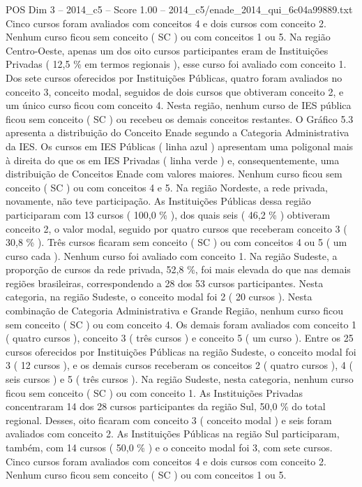 \begin{textsample}{POS Dim 3 – 2014\_c5 – Score 1.00 – 2014\_c5/enade\_2014\_qui\_6c04a99889.txt}
Cinco cursos foram avaliados com conceitos 4 e dois cursos com conceito 2.
Nenhum curso ficou sem conceito ( SC ) ou com conceitos 1 ou 5.
Na região Centro-Oeste, apenas um dos oito cursos participantes eram de Instituições Privadas ( 12,5 \% em termos regionais ), esse curso foi avaliado com conceito 1.
Dos sete cursos oferecidos por Instituições Públicas, quatro foram avaliados no conceito 3, conceito modal, seguidos de dois cursos que obtiveram conceito 2, e um único curso ficou com conceito 4.
Nesta região, nenhum curso de IES pública ficou sem conceito ( SC ) ou recebeu os demais conceitos restantes.
O Gráfico 5.3 apresenta a distribuição do Conceito Enade segundo a Categoria Administrativa da IES.
Os cursos em IES Públicas ( linha azul ) apresentam uma poligonal mais à direita do que os em IES Privadas ( linha verde ) e, consequentemente, uma distribuição de Conceitos Enade com valores maiores.
Nenhum curso ficou sem conceito ( SC ) ou com conceitos 4 e 5.
Na região Nordeste, a rede privada, novamente, não teve participação.
As Instituições Públicas dessa região participaram com 13 cursos ( 100,0 \% ), dos quais seis ( 46,2 \% ) obtiveram conceito 2, o valor modal, seguido por quatro cursos que receberam conceito 3 ( 30,8 \% ).
Três cursos ficaram sem conceito ( SC ) ou com conceitos 4 ou 5 ( um curso cada ).
Nenhum curso foi avaliado com conceito 1.
Na região Sudeste, a proporção de cursos da rede privada, 52,8 \%, foi mais elevada do que nas demais regiões brasileiras, correspondendo a 28 dos 53 cursos participantes.
Nesta categoria, na região Sudeste, o conceito modal foi 2 ( 20 cursos ).
Nesta combinação de Categoria Administrativa e Grande Região, nenhum curso ficou sem conceito ( SC ) ou com conceito 4.
Os demais foram avaliados com conceito 1 ( quatro cursos ), conceito 3 ( três cursos ) e conceito 5 ( um curso ).
Entre os 25 cursos oferecidos por Instituições Públicas na região Sudeste, o conceito modal foi 3 ( 12 cursos ), e os demais cursos receberam os conceitos 2 ( quatro cursos ), 4 ( seis cursos ) e 5 ( três cursos ).
Na região Sudeste, nesta categoria, nenhum curso ficou sem conceito ( SC ) ou com conceito 1.
As Instituições Privadas concentraram 14 dos 28 cursos participantes da região Sul, 50,0 \% do total regional.
Desses, oito ficaram com conceito 3 ( conceito modal ) e seis foram avaliados com conceito 2.
As Instituições Públicas na região Sul participaram, também, com 14 cursos ( 50,0 \% ) e o conceito modal foi 3, com sete cursos.
Cinco cursos foram avaliados com conceitos 4 e dois cursos com conceito 2.
Nenhum curso ficou sem conceito ( SC ) ou com conceitos 1 ou 5.

\end{textsample}
